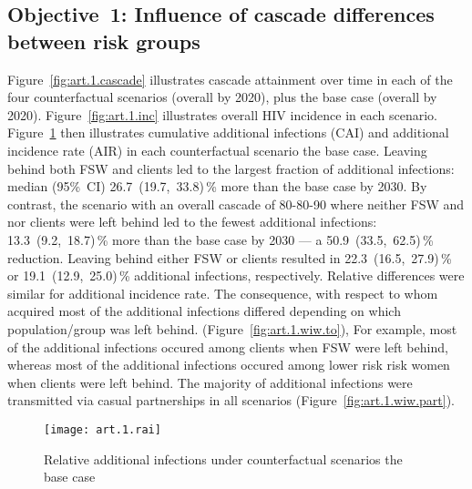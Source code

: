 \subsection{Objective~1: Influence of cascade differences between risk groups}\label{art.res.1} %
Figure~\ref{fig:art.1.cascade} illustrates cascade attainment over time
in each of the four counterfactual scenarios (\casmd overall by 2020),
plus the base case (\cashi overall by 2020).
Figure~\ref{fig:art.1.inc} illustrates overall HIV incidence in each scenario.
Figure~\ref{fig:art.1.rai} then illustrates
cumulative additional infections (CAI) and additional incidence rate (AIR)
in each counterfactual scenario \vs the base case.
Leaving behind both FSW and clients led to the largest fraction of additional infections: median (95\%~CI)
26.7~(19.7,~33.8)\,\% more than the base case by 2030. %
By contrast, the scenario with an overall cascade of 80-80-90 where neither  %
FSW and nor clients were left behind led to the fewest additional infections:
13.3~(9.2,~18.7)\,\% more than the base case by 2030 --- %
a 50.9~(33.5,~62.5)\,\% reduction. %
Leaving behind either FSW or clients resulted in
22.3~(16.5,~27.9)\,\% or 19.1~(12.9,~25.0)\,\% additional infections, respectively. %
Relative differences were similar for additional incidence rate.
The consequence, with respect to whom acquired most of the additional infections differed depending on which population/group was left behind. %
(Figure~\ref{fig:art.1.wiw.to}),
For example, most of the additional infections occured among clients when FSW were left behind,
whereas most of the additional infections occured among lower risk risk women when clients were left behind.
The majority of additional infections were transmitted  %
via casual partnerships in all scenarios (Figure~\ref{fig:art.1.wiw.part}). %
\begin{figure}[h]
  \centering\texttt{[image: art.1.rai]}
  \caption{Relative additional infections under counterfactual scenarios \vs the base case}
  \label{fig:art.1.rai}
\end{figure}
